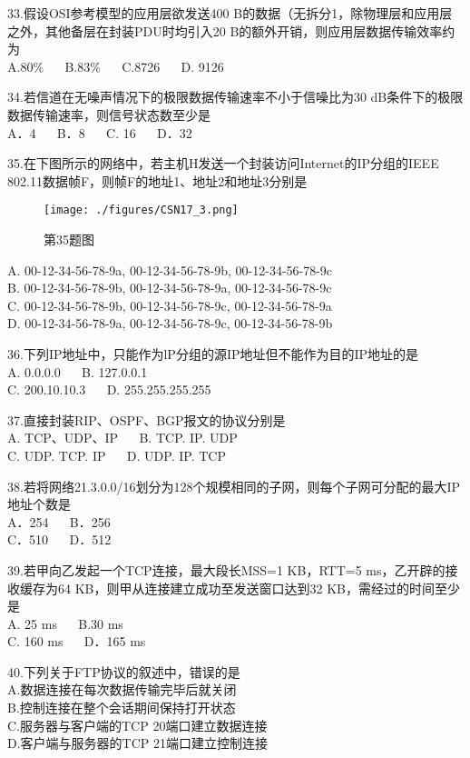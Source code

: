33.假设OSI参考模型的应用层欲发送400 B的数据（无拆分1，除物理层和应用层之外，其他备层在封装PDU时均引入20 B的额外开销，则应用层数据传输效率约为 \\
A.80\%  $\quad$  B.83\%  $\quad$  C.8726 $\quad$ D. 9126

34.若信道在无噪声情况下的极限数据传输速率不小于信噪比为30 dB条件下的极限数据传输速率，则信号状态数至少是 \\
A．4 $\quad$  B．8 $\quad$ C. 16 $\quad$ D．32

35.在下图所示的网络中，若主机H发送一个封装访问Internet的IP分组的IEEE 802.11数据帧F，则帧F的地址1、地址2和地址3分别是 \\
\begin{figure}[ht]
\centering
\texttt{[image: ./figures/CSN17\_3.png]}
\caption{第35题图} \label{CSN17_fig3}
\end{figure}
A. 00-12-34-56-78-9a, 00-12-34-56-78-9b, 00-12-34-56-78-9c \\
B. 00-12-34-56-78-9b, 00-12-34-56-78-9a, 00-12-34-56-78-9c \\
C. 00-12-34-56-78-9b, 00-12-34-56-78-9c, 00-12-34-56-78-9a \\
D. 00-12-34-56-78-9a, 00-12-34-56-78-9c, 00-12-34-56-78-9b

36.下列IP地址中，只能作为lP分组的源IP地址但不能作为目的IP地址的是 \\
A. 0.0.0.0  $\quad$  B. 127.0.0.1 \\
C. 200.10.10.3  $\quad$  D. 255.255.255.255

37.直接封装RIP、OSPF、BGP报文的协议分别是 \\
A. TCP、UDP、IP  $\quad$  B. TCP. IP. UDP \\
C. UDP. TCP. IP  $\quad$  D. UDP. IP. TCP

38.若将网络21.3.0.0/16划分为128个规模相同的子网，则每个子网可分配的最大IP地址个数是 \\
A．254  $\quad$  B．256 \\
C．510  $\quad$  D．512

39.若甲向乙发起一个TCP连接，最大段长MSS=1 KB，RTT=5 ms，乙开辟的接收缓存为64 KB，则甲从连接建立成功至发送窗口达到32 KB，需经过的时间至少是 \\
A. 25 ms  $\quad$  B.30 ms  \\
C. 160 ms $\quad$  D．165 ms

40.下列关于FTP协议的叙述中，错误的是 \\
A.数据连接在每次数据传输完毕后就关闭 \\
B.控制连接在整个会话期间保持打开状态 \\
C.服务器与客户端的TCP 20端口建立数据连接 \\
D.客户端与服务器的TCP 21端口建立控制连接

